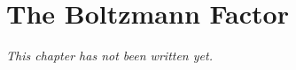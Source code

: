 \chapter{The Boltzmann Factor}\label{ch:b2:boltzmann-factor}


\emph{This chapter has not been written yet.}

